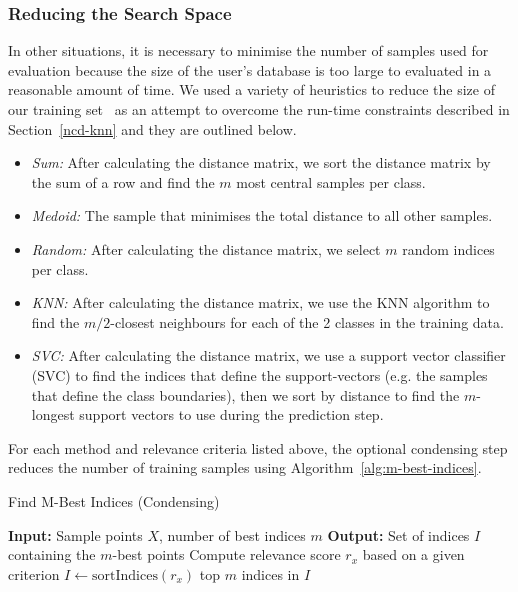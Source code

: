 \documentclass[conference]{IEEEtran}
\begin{document}
\subsubsection{Reducing the Search Space}
\label{condensing_methods}
In other situations, it is necessary to minimise the number of samples used for evaluation because the size of the user's database is too large to evaluated in a reasonable amount of time. We used a variety of heuristics to reduce the size of our training set~\cite{amal2011survey} as an attempt to overcome the run-time constraints described in Section~\ref{ncd-knn} and they are outlined below.
\begin{itemize}
    \item \textit{Sum:} After calculating the distance matrix, we sort the distance matrix by the sum of a row and find the $m$ most central samples per class.
    \item \textit{Medoid:} The sample that minimises the total distance to all other samples.
    \item \textit{Random:} After calculating the distance matrix, we select $m$ random indices per class.
    \item \textit{KNN:} After calculating the distance matrix, we use the KNN algorithm to find the $m/2$-closest neighbours for each of the 2 classes in the training data.
    \item \textit{SVC:} After calculating the distance matrix, we use a support vector classifier (SVC) to find the indices that define the support-vectors (e.g. the samples that define the class boundaries), then we sort by distance to find the $m$-longest support vectors to use during the prediction step.
\end{itemize}
For each method and relevance criteria listed above, the optional condensing step reduces the number of training samples using Algorithm~\ref{alg:m-best-indices}.
\begin{algorithm}
  \caption{Find M-Best Indices (Condensing)}
  \label{alg:m-best-indices}
  \begin{algorithmic}
    \State \textbf{Input:} Sample points $X$, number of best indices $m$
    \State \textbf{Output:} Set of indices $I$ containing the $m$-best points
      \State Compute relevance score $r_x$ based on a given criterion
    \EndFor
    \State $I \gets \text{sortIndices}(r_x)$
    \State \Return top $m$ indices in $I$
  \end{algorithmic}
\end{algorithm}
\end{document}
